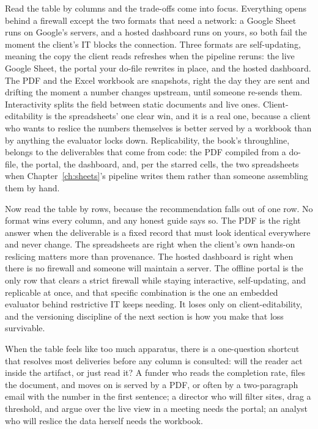 Read the table by columns and the trade-offs come into focus. Everything opens behind a firewall except the two formats that need a network: a Google Sheet runs on Google's servers, and a hosted dashboard runs on yours, so both fail the moment the client's IT blocks the connection. Three formats are self-updating, meaning the copy the client reads refreshes when the pipeline reruns: the live Google Sheet, the portal your do-file rewrites in place, and the hosted dashboard. The PDF and the Excel workbook are snapshots, right the day they are sent and drifting the moment a number changes upstream, until someone re-sends them. Interactivity splits the field between static documents and live ones. Client-editability is the spreadsheets' one clear win, and it is a real one, because a client who wants to reslice the numbers themselves is better served by a workbook than by anything the evaluator locks down. Replicability, the book's throughline, belongs to the deliverables that come from code: the PDF compiled from a do-file, the portal, the dashboard, and, per the starred cells, the two spreadsheets when Chapter~\ref{ch:sheets}'s pipeline writes them rather than someone assembling them by hand.

Now read the table by rows, because the recommendation falls out of one row. No format wins every column, and any honest guide says so. The PDF is the right answer when the deliverable is a fixed record that must look identical everywhere and never change. The spreadsheets are right when the client's own hands-on reslicing matters more than provenance. The hosted dashboard is right when there is no firewall and someone will maintain a server. The offline portal is the only row that clears a strict firewall while staying interactive, self-updating, and replicable at once, and that specific combination is the one an embedded evaluator behind restrictive IT keeps needing. It loses only on client-editability, and the versioning discipline of the next section is how you make that loss survivable.

When the table feels like too much apparatus, there is a one-question shortcut that resolves most deliveries before any column is consulted: will the reader act inside the artifact, or just read it? A funder who reads the completion rate, files the document, and moves on is served by a PDF, or often by a two-paragraph email with the number in the first sentence; a director who will filter sites, drag a threshold, and argue over the live view in a meeting needs the portal; an analyst who will reslice the data herself needs the workbook.

